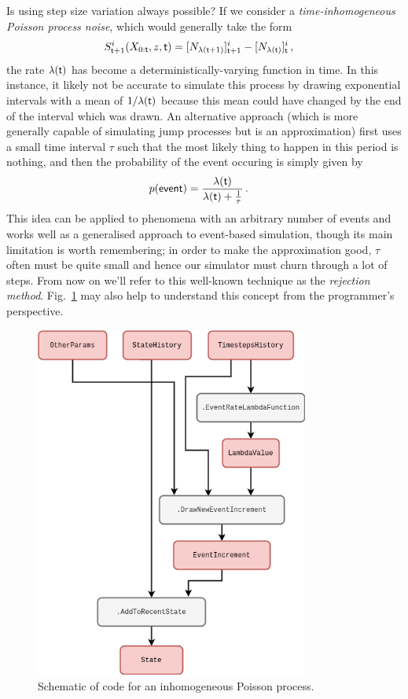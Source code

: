 Is using step size variation always possible? If we consider a \emph{time-inhomogeneous Poisson process noise}, which would generally take the form
\begin{align}
S^{i}_{{\sf t}+1}(X_{0:{\sf t}},z,{\sf t}) &= [N_{\lambda ({\sf t}+1)}]^i_{{\sf t}+1}-[N_{\lambda ({\sf t})}]^i_{\sf t}\,,
\end{align}
the rate $\lambda ({\sf t})$ has become a deterministically-varying function in time. In this instance, it likely not be accurate to simulate this process by drawing exponential intervals with a mean of $1/\lambda ({\sf t})$ because this mean could have changed by the end of the interval which was drawn. An alternative approach (which is more generally capable of simulating jump processes but is an approximation) first uses a small time interval $\tau$ such that the most likely thing to happen in this period is nothing, and then the probability of the event occuring is simply given by
\begin{align}
p({\sf event}) &= \frac{\lambda ({\sf t})}{\lambda ({\sf t}) + \frac{1}{\tau}} \label{eq:rejection}\,.
\end{align}
This idea can be applied to phenomena with an arbitrary number of events and works well as a generalised approach to event-based simulation, though its main limitation is worth remembering; in order to make the approximation good, $\tau$ often must be quite small and hence our simulator must churn through a lot of steps. From now on we'll refer to this well-known technique as the \emph{rejection method}. Fig.~\ref{fig:inhomogeneous-poisson} may also help to understand this concept from the programmer's perspective.

\begin{figure}[h]
\centering
\includegraphics[width=9cm]{images/chapter-1-inhomogeneous-poisson.drawio.png}
\caption{Schematic of code for an inhomogeneous Poisson process.}
\label{fig:inhomogeneous-poisson}
\end{figure}

